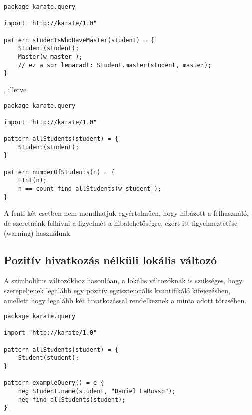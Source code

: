 \begin{lstlisting}
package karate.query

import "http://karate/1.0"

pattern studentsWhoHaveMaster(student) = {
    Student(student);
    Master(w_master_);
    // ez a sor lemaradt: Student.master(student, master);
}
\end{lstlisting}
%
%
, illetve
%
\begin{lstlisting}
package karate.query

import "http://karate/1.0"

pattern allStudents(student) = {
    Student(student);
}

pattern numberOfStudents(n) = {
    EInt(n);
    n == count find allStudents(w_student_);
}
\end{lstlisting}
%
%
A fenti két esetben nem mondhatjuk egyértelműen, hogy hibázott a felhasználó, de szeretnénk felhívni a figyelmét a hibalehetőségre, ezért itt figyelmeztetése (warning) használunk.

\subsection{Pozitív hivatkozás nélküli lokális változó}

A szimbolikus változókhoz hasonlóan, a lokális változóknak is szükséges, hogy szerepeljenek legalább egy pozitív egzisztenciális kvantifikáló kifejezésben, amellett hogy legalább két hivatkozással rendelkeznek a minta adott törzsében.
%
\begin{lstlisting}
package karate.query

import "http://karate/1.0"

pattern allStudents(student) = {
    Student(student);
}

pattern exampleQuery() = e_{
    neg Student.name(student, "Daniel LaRusso");
    neg find allStudents(student);
}_
\end{lstlisting}
%
